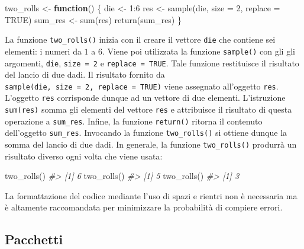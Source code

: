 \documentclass[
]{memoir}
\newenvironment{Shaded}{\begin{snugshade}}{\end{snugshade}}
\newcommand{\AttributeTok}[1]{\textcolor[rgb]{0.77,0.63,0.00}{#1}}
\newcommand{\CommentTok}[1]{\textcolor[rgb]{0.56,0.35,0.01}{\textit{#1}}}
\newcommand{\ConstantTok}[1]{\textcolor[rgb]{0.00,0.00,0.00}{#1}}
\newcommand{\ControlFlowTok}[1]{\textcolor[rgb]{0.13,0.29,0.53}{\textbf{#1}}}
\newcommand{\DecValTok}[1]{\textcolor[rgb]{0.00,0.00,0.81}{#1}}
\newcommand{\FunctionTok}[1]{\textcolor[rgb]{0.00,0.00,0.00}{#1}}
\newcommand{\NormalTok}[1]{#1}
\newcommand{\OtherTok}[1]{\textcolor[rgb]{0.56,0.35,0.01}{#1}}
\newcommand{\SpecialCharTok}[1]{\textcolor[rgb]{0.00,0.00,0.00}{#1}}
\theoremstyle{definition}
\theoremstyle{definition}
\theoremstyle{definition}
\theoremstyle{definition}
\theoremstyle{remark}
\begin{document}
\begin{Shaded}
\begin{Highlighting}[]
\NormalTok{two\_rolls }\OtherTok{\textless{}{-}} \ControlFlowTok{function}\NormalTok{() \{}
\NormalTok{  die }\OtherTok{\textless{}{-}} \DecValTok{1}\SpecialCharTok{:}\DecValTok{6}
\NormalTok{  res }\OtherTok{\textless{}{-}} \FunctionTok{sample}\NormalTok{(die, }\AttributeTok{size =} \DecValTok{2}\NormalTok{, }\AttributeTok{replace =} \ConstantTok{TRUE}\NormalTok{)}
\NormalTok{  sum\_res }\OtherTok{\textless{}{-}} \FunctionTok{sum}\NormalTok{(res)}
  \FunctionTok{return}\NormalTok{(sum\_res)}
\NormalTok{\}}
\end{Highlighting}
\end{Shaded}

La funzione \texttt{two\_rolls()} inizia con il creare il vettore \texttt{die} che
contiene sei elementi: i numeri da \(1\) a \(6\). Viene poi utilizzata la
funzione \texttt{sample()} con gli gli argomenti, \texttt{die}, \texttt{size\ =\ 2} e
\texttt{replace\ =\ TRUE}. Tale funzione restituisce il risultato del lancio di
due dadi. Il risultato fornito da \texttt{sample(die,\ size\ =\ 2,\ replace\ =\ TRUE)} viene assegnato all'oggetto \texttt{res}. L'oggetto \texttt{res} corrisponde dunque ad un vettore di due elementi.
L'istruzione \texttt{sum(res)} somma gli elementi del vettore \texttt{res} e
attribuisce il risultato di questa operazione a \texttt{sum\_res}. Infine, la
funzione \texttt{return()} ritorna il contenuto dell'oggetto \texttt{sum\_res}.
Invocando la funzione \texttt{two\_rolls()} si ottiene dunque la somma del
lancio di due dadi. In generale, la funzione \texttt{two\_rolls()} produrrà un
risultato diverso ogni volta che viene usata:

\begin{Shaded}
\begin{Highlighting}[]
\FunctionTok{two\_rolls}\NormalTok{()}
\CommentTok{\#\textgreater{} [1] 6}
\FunctionTok{two\_rolls}\NormalTok{()}
\CommentTok{\#\textgreater{} [1] 5}
\FunctionTok{two\_rolls}\NormalTok{()}
\CommentTok{\#\textgreater{} [1] 3}
\end{Highlighting}
\end{Shaded}

La formattazione del codice mediante l'uso di spazi e rientri non è
necessaria ma è altamente raccomandata per minimizzare la probabilità di
compiere errori.

\hypertarget{pacchetti}{%
\subsection{Pacchetti}\label{pacchetti}}
\end{document}

